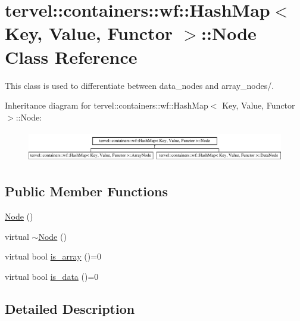 \hypertarget{classtervel_1_1containers_1_1wf_1_1_hash_map_1_1_node}{}\section{tervel\+:\+:containers\+:\+:wf\+:\+:Hash\+Map$<$ Key, Value, Functor $>$\+:\+:Node Class Reference}
\label{classtervel_1_1containers_1_1wf_1_1_hash_map_1_1_node}


This class is used to differentiate between data\+\_\+nodes and array\+\_\+nodes/.  


Inheritance diagram for tervel\+:\+:containers\+:\+:wf\+:\+:Hash\+Map$<$ Key, Value, Functor $>$\+:\+:Node\+:\begin{figure}[H]
\begin{center}
\leavevmode
\includegraphics[height=1.379310cm]{classtervel_1_1containers_1_1wf_1_1_hash_map_1_1_node}
\end{center}
\end{figure}
\subsection*{Public Member Functions}
\begin{DoxyCompactItemize}
\item 
\hyperlink{classtervel_1_1containers_1_1wf_1_1_hash_map_1_1_node_a527126a2a9e22cce4e8ea3634168de62}{Node} ()
\item 
virtual \hyperlink{classtervel_1_1containers_1_1wf_1_1_hash_map_1_1_node_aa9a636d0614e3bb54e81543027558a08}{$\sim$\+Node} ()
\item 
virtual bool \hyperlink{classtervel_1_1containers_1_1wf_1_1_hash_map_1_1_node_a0908bd3151f0b1b7f8fbb6825731fd15}{is\+\_\+array} ()=0
\item 
virtual bool \hyperlink{classtervel_1_1containers_1_1wf_1_1_hash_map_1_1_node_ac7cc7039cfc134def7d936f00efc2155}{is\+\_\+data} ()=0
\end{DoxyCompactItemize}


\subsection{Detailed Description}
